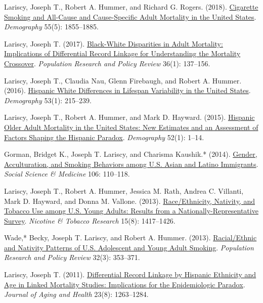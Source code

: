 \documentclass[11pt,]{article}
\begin{document}
Lariscy, Joseph T., Robert A. Hummer, and Richard G. Rogers. (2018).
\href{https://read.dukeupress.edu/demography/article/55/5/1855/167925/Cigarette-Smoking-and-All-Cause-and-Cause-Specific}{Cigarette
Smoking and All-Cause and Cause-Specific Adult Mortality in the United
States}. \emph{Demography} 55(5): 1855--1885.

Lariscy, Joseph T. (2017).
\href{https://link.springer.com/article/10.1007/s11113-016-9415-z}{Black-White
Disparities in Adult Mortality: Implications of Differential Record
Linkage for Understanding the Mortality Crossover}. \emph{Population
Research and Policy Review} 36(1): 137--156.

Lariscy, Joseph T., Claudia Nau, Glenn Firebaugh, and Robert A. Hummer.
(2016).
\href{https://read.dukeupress.edu/demography/article/53/1/215/167323/Hispanic-White-Differences-in-Lifespan-Variability}{Hispanic
White Differences in Lifespan Variability in the United States}.
\emph{Demography} 53(1): 215--239.

Lariscy, Joseph T., Robert A. Hummer, and Mark D. Hayward. (2015).
\href{https://read.dukeupress.edu/demography/article/52/1/1/169365/Hispanic-Older-Adult-Mortality-in-the-United}{Hispanic
Older Adult Mortality in the United States: New Estimates and an
Assessment of Factors Shaping the Hispanic Paradox}. \emph{Demography}
52(1): 1--14.

Gorman, Bridget K., Joseph T. Lariscy, and Charisma Kaushik.* (2014).
\href{https://www.sciencedirect.com/science/article/pii/S0277953614000999?via\%3Dihub}{Gender,
Acculturation, and Smoking Behaviors among U.S. Asian and Latino
Immigrants}. \emph{Social Science \& Medicine} 106: 110--118.

Lariscy, Joseph T., Robert A. Hummer, Jessica M. Rath, Andrea C.
Villanti, Mark D. Hayward, and Donna M. Vallone. (2013).
\href{https://academic.oup.com/ntr/article/15/8/1417/1283744}{Race/Ethnicity,
Nativity, and Tobacco Use among U.S. Young Adults: Results from a
Nationally-Representative Survey}. \emph{Nicotine \& Tobacco Research}
15(8): 1417--1426.

Wade,* Becky, Joseph T. Lariscy, and Robert A. Hummer. (2013).
\href{https://link.springer.com/article/10.1007/s11113-013-9275-8}{Racial/Ethnic
and Nativity Patterns of U.S. Adolescent and Young Adult Smoking}.
\emph{Population Research and Policy Review} 32(3): 353--371.

Lariscy, Joseph T. (2011).
\href{https://journals.sagepub.com/doi/full/10.1177/0898264311421369}{Differential
Record Linkage by Hispanic Ethnicity and Age in Linked Mortality
Studies: Implications for the Epidemiologic Paradox}. \emph{Journal of
Aging and Health} 23(8): 1263--1284.
\end{document}
